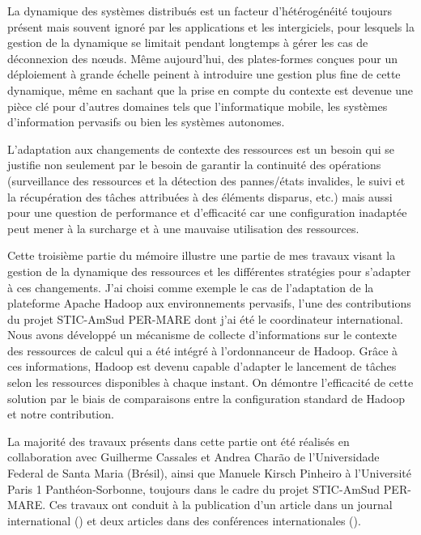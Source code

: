 \begin{resume}

%

La dynamique des systèmes distribués est un facteur d'hétérogénéité toujours présent mais souvent ignoré par les applications et les intergiciels, pour lesquels la gestion de la dynamique se limitait pendant longtemps à gérer les cas de déconnexion des n{\oe}uds. Même aujourd'hui, des plates-formes conçues pour un déploiement à grande échelle peinent à introduire une gestion plus fine de cette dynamique, même en sachant que la prise en compte du contexte est devenue une pièce clé pour d'autres domaines tels que l'informatique mobile, les systèmes d'information pervasifs ou bien les systèmes autonomes.

L'adaptation aux changements de contexte des ressources est un besoin qui se justifie non seulement par le besoin de garantir la continuité des opérations (surveillance des ressources et la détection des pannes/états invalides, le suivi et la récupération des tâches attribuées à des éléments disparus, etc.) mais aussi pour une question de performance et d'efficacité car une configuration inadaptée peut mener à la surcharge et à une mauvaise utilisation des ressources. 

Cette troisième partie du mémoire illustre une partie de mes travaux visant la gestion de la dynamique des ressources et les différentes stratégies pour s'adapter à ces changements. J'ai choisi comme exemple le cas de l'adaptation de la plateforme Apache Hadoop aux environnements pervasifs, l'une des contributions du projet STIC-AmSud PER-MARE dont j'ai été le coordinateur international. Nous avons développé un mécanisme de collecte d'informations sur le contexte des ressources de calcul qui a été intégré à l'ordonnanceur de Hadoop. Grâce à ces informations, Hadoop est devenu capable d'adapter le lancement de tâches selon les ressources disponibles à chaque instant. On démontre l'efficacité de cette solution par le biais de comparaisons entre la configuration standard de Hadoop et notre contribution. 

La majorité des travaux présents dans cette partie ont été réalisés en collaboration avec Guilherme Cassales et Andrea Charão de l'Universidade Federal de Santa Maria (Brésil), ainsi que Manuele Kirsch Pinheiro à l'Université Paris 1 Panthéon-Sorbonne, toujours dans le cadre du projet STIC-AmSud PER-MARE. Ces travaux ont conduit à la publication d'un article dans un journal international (\cite{Steffenel2016-JAIHC}) et deux articles dans des conférences internationales (\cite{Steffenel2015-ANT, Steffenel2014-Hadoop}).


\end{resume}

